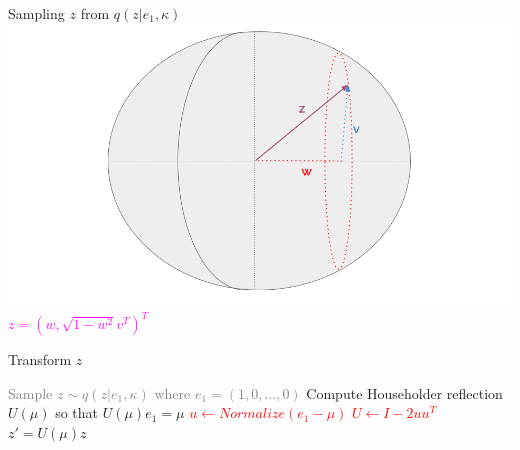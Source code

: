 \begin{frame}{Sampling $z$ from $q(z|e_1, \kappa)$}
  \centering
  \includegraphics[width=\textwidth]{figures/illustration_sampling_4.png}
  \textcolor{magenta}{$z = (w, \sqrt{1 - w^2}v^T)^T$}
\end{frame}

\begin{frame}{Transform $z$}
  \begin{algorithm}[H]
    \caption{Overview of the sampling method from $\mathcal{S}(\mu, \kappa)$}\label{alg:overviewsampling3}
    \begin{algorithmic}[1]
      \STATE \textcolor{gray}{ Sample $z \sim q(z| e_1, \kappa)$ where $e_1 = (1, 0, \dots, 0)$ }
      \STATE Compute Householder reflection $U(\mu)$ so that $U(\mu) e_1 = \mu$
      \textcolor{red}{
      \STATE $u \gets Normalize(e_1 - \mu)$ 
      \STATE $U \gets I - 2uu^T$
      }
      \RETURN $z' = U(\mu) z$
    \end{algorithmic}
    \end{algorithm}
\end{frame}
